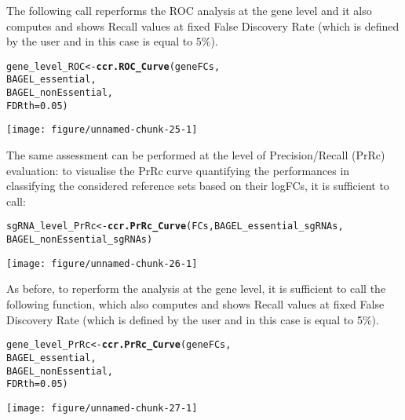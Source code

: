 \documentclass{article}\usepackage[]{graphicx}\usepackage[]{color}
\makeatletter
\def\maxwidth{ %
  \ifdim\Gin@nat@width>\linewidth
    \linewidth
  \else
    \Gin@nat@width
  \fi
}
\newcommand{\hlnum}[1]{\textcolor[rgb]{0.686,0.059,0.569}{#1}}%
\newcommand{\hlstd}[1]{\textcolor[rgb]{0.345,0.345,0.345}{#1}}%
\newcommand{\hlkwb}[1]{\textcolor[rgb]{0.69,0.353,0.396}{#1}}%
\newcommand{\hlkwc}[1]{\textcolor[rgb]{0.333,0.667,0.333}{#1}}%
\newcommand{\hlkwd}[1]{\textcolor[rgb]{0.737,0.353,0.396}{\textbf{#1}}}%
\newenvironment{kframe}{%
 \def\at@end@of@kframe{}%
 \ifinner\ifhmode%
  \def\at@end@of@kframe{\end{minipage}}%
  \begin{minipage}{\columnwidth}%
 \fi\fi%
 \def\FrameCommand##1{\hskip\@totalleftmargin \hskip-\fboxsep
 \colorbox{shadecolor}{##1}\hskip-\fboxsep
     \hskip-\linewidth \hskip-\@totalleftmargin \hskip\columnwidth}%
 \MakeFramed {\advance\hsize-\width
   \@totalleftmargin\z@ \linewidth\hsize
   \@setminipage}}%
 {\par\unskip\endMakeFramed%
 \at@end@of@kframe}
\newenvironment{knitrout}{}{} %
\makeatother
\begin{document}
The following call reperforms the ROC analysis at the gene level and it also computes and shows Recall values at fixed False Discovery Rate (which is defined by the user and in this case is equal to 5\%).

\begin{knitrout}
\color{fgcolor}\begin{kframe}
\begin{alltt}
\hlstd{gene_level_ROC}\hlkwb{<-}\hlkwd{ccr.ROC_Curve}\hlstd{(geneFCs,}
                         \hlstd{BAGEL_essential,}
                         \hlstd{BAGEL_nonEssential,}
                         \hlkwc{FDRth} \hlstd{=} \hlnum{0.05}\hlstd{)}
\end{alltt}
\end{kframe}
\texttt{[image: figure/unnamed-chunk-25-1]} 

\end{knitrout}


The same assessment can be performed at the level of Precision/Recall (PrRc) evaluation: to visualise the PrRc curve quantifying the performances in classifying the considered reference sets based on their logFCs, it is sufficient to call:
\begin{knitrout}
\color{fgcolor}\begin{kframe}
\begin{alltt}
\hlstd{sgRNA_level_PrRc}\hlkwb{<-}\hlkwd{ccr.PrRc_Curve}\hlstd{(FCs,BAGEL_essential_sgRNAs,}
                              \hlstd{BAGEL_nonEssential_sgRNAs)}
\end{alltt}
\end{kframe}
\texttt{[image: figure/unnamed-chunk-26-1]} 

\end{knitrout}
%
As before, to reperform the analysis at the gene level, it is sufficient to call the following function, which also computes and shows Recall values at fixed False Discovery Rate (which is defined by the user and in this case is equal to 5\%).

\begin{knitrout}
\color{fgcolor}\begin{kframe}
\begin{alltt}
\hlstd{gene_level_PrRc}\hlkwb{<-}\hlkwd{ccr.PrRc_Curve}\hlstd{(geneFCs,}
                         \hlstd{BAGEL_essential,}
                         \hlstd{BAGEL_nonEssential,}
                         \hlkwc{FDRth} \hlstd{=} \hlnum{0.05}\hlstd{)}
\end{alltt}
\end{kframe}
\texttt{[image: figure/unnamed-chunk-27-1]} 

\end{knitrout}
\end{document}
